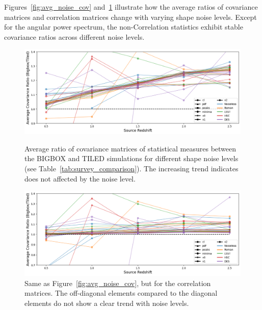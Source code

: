 Figures~\ref{fig:avg_noise_cov} and~\ref{fig:avg_noise_corr} illustrate how the average ratios of covariance matrices and correlation matrices change with varying shape noise levels. Except for the angular power spectrum, the non-Correlation statistics exhibit stable covariance ratios across different noise levels. 

\begin{figure}[p]
    \centering
    \includegraphics[width=\textwidth]{figures/results/avg_cov_ratio_ngal.png}
    \caption[Average BIGBOX/TILED Ratio of Covariance for multiple noise levels]{Average ratio of covariance matrices of statistical measures between the BIGBOX and TILED simulations for different shape noise levels (see Table~\ref{tab:survey_comparison}). The increasing trend indicates does not affected by the noise level.}
    \label{fig:avg_noise_cov}
    \vspace{2cm}
    \includegraphics[width=\textwidth]{figures/results/avg_corr_ratio_ngal.png}
    \caption[Average BIGBOX/TILED Ratio of Correlation for multiple noise levels]{Same as Figure~\ref{fig:avg_noise_cov}, but for the correlation matrices. The off-diagonal elements compared to the diagonal elements do not show a clear trend with noise levels.}
    \label{fig:avg_noise_corr}
\end{figure}

